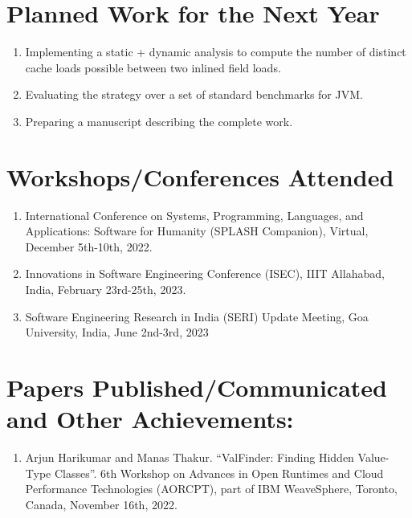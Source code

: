 \documentclass[12 pt, a4paper]{article}
\begin{document}
\section{Planned Work for the Next Year}   
 \begin{enumerate}
\item Implementing a static + dynamic analysis to compute the number of distinct
		cache loads possible between two inlined field loads.

\item Evaluating the strategy over a set of standard benchmarks for JVM.

\item Preparing a manuscript describing the complete work.
 
\end{enumerate} 





\vskip 0.7cm
\section{Workshops/Conferences Attended}
\begin{enumerate}
\item International Conference on Systems, Programming, 
Languages, and Applications: Software for Humanity 
(SPLASH Companion), Virtual, December 5th-10th, 2022.
\item {} Innovations in Software Engineering Conference (ISEC), 
IIIT Allahabad, India, February 23rd-25th, 2023.
\item Software Engineering Research in India (SERI) Update Meeting, 
Goa University, India, June 2nd-3rd, 2023
\end{enumerate} 



\section{Papers Published/Communicated and Other Achievements:} 
\begin{enumerate}
\item Arjun Harikumar and Manas Thakur. “ValFinder: Finding Hidden Value-Type Classes”. 
6th Workshop on Advances in Open Runtimes and Cloud Performance Technologies (AORCPT), part of IBM WeaveSphere, Toronto, Canada, November 16th, 2022.
\end{enumerate} 
\end{document}
